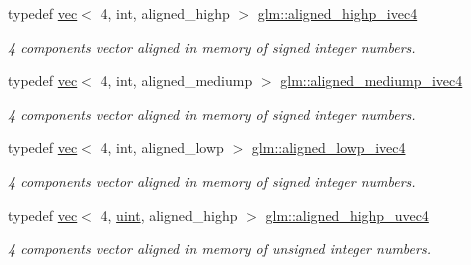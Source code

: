 \begin{DoxyCompactItemize}
\mbox{\label{group__gtc__type__aligned_gabbac4883efc1760f4efb450753794f2d}} 
typedef \hyperlink{structglm_1_1vec}{vec}$<$ 4, int, aligned\+\_\+highp $>$ \hyperlink{group__gtc__type__aligned_gabbac4883efc1760f4efb450753794f2d}{glm\+::aligned\+\_\+highp\+\_\+ivec4}
\begin{DoxyCompactList}\small\item\em 4 components vector aligned in memory of signed integer numbers. \end{DoxyCompactList}\item 
\mbox{\label{group__gtc__type__aligned_ga6960abdd6dda1c21b99d28894414ff67}} 
typedef \hyperlink{structglm_1_1vec}{vec}$<$ 4, int, aligned\+\_\+mediump $>$ \hyperlink{group__gtc__type__aligned_ga6960abdd6dda1c21b99d28894414ff67}{glm\+::aligned\+\_\+mediump\+\_\+ivec4}
\begin{DoxyCompactList}\small\item\em 4 components vector aligned in memory of signed integer numbers. \end{DoxyCompactList}\item 
\mbox{\label{group__gtc__type__aligned_ga45a747351d314655f410cbdb942eea41}} 
typedef \hyperlink{structglm_1_1vec}{vec}$<$ 4, int, aligned\+\_\+lowp $>$ \hyperlink{group__gtc__type__aligned_ga45a747351d314655f410cbdb942eea41}{glm\+::aligned\+\_\+lowp\+\_\+ivec4}
\begin{DoxyCompactList}\small\item\em 4 components vector aligned in memory of signed integer numbers. \end{DoxyCompactList}\item 
\mbox{\label{group__gtc__type__aligned_ga85553b476297f73c07bf3228ffb02d81}} 
typedef \hyperlink{structglm_1_1vec}{vec}$<$ 4, \hyperlink{group__core__precision_ga4fd29415871152bfb5abd588334147c8}{uint}, aligned\+\_\+highp $>$ \hyperlink{group__gtc__type__aligned_ga85553b476297f73c07bf3228ffb02d81}{glm\+::aligned\+\_\+highp\+\_\+uvec4}
\begin{DoxyCompactList}\small\item\em 4 components vector aligned in memory of unsigned integer numbers. \end{DoxyCompactList}\item 
\mbox{\label{group__gtc__type__aligned_gace9017071502bcfcd099532706881836}} 

\end{DoxyCompactItemize}
